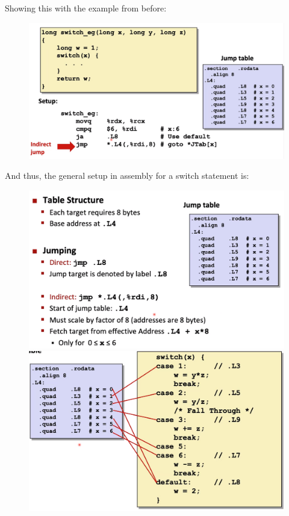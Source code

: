 \documentclass[12pt]{book}
\begin{document}
Showing this with the example from before:
\begin{figure}[h]
        \centering
        \includegraphics[scale = 0.3]{./figures/switchEx}
\end{figure}

And thus, the general setup in assembly for a switch statement is:
\pagebreak

\begin{figure}[h]
        \centering
        \includegraphics[scale = 0.3]{./figures/switchStruct}
        \includegraphics[scale = 0.3]{./figures/switchEx2}
\end{figure}
\end{document}
